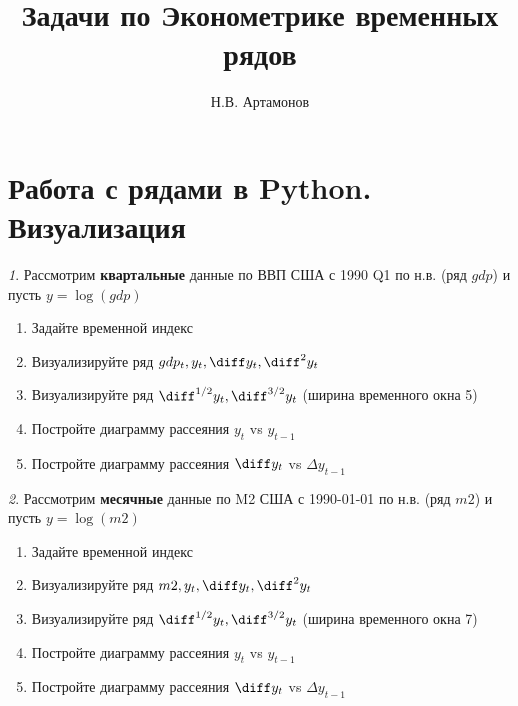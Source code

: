 \documentclass[12pt]{article}
\title{Задачи по Эконометрике временных рядов}
\author{Н.В. Артамонов}
\theoremstyle{remark}
\newtheorem{exercise}{}[subsection]
\begin{document}
\maketitle

\tableofcontents

\section{Работа с рядами в Python. Визуализация}

\begin{exercise}
Рассмотрим \textbf{квартальные} данные по ВВП США с 1990 Q1 по н.в. (ряд \(gdp\))
и пусть \(y=\log(gdp)\)
\begin{enumerate}
	\item Задайте временной индекс
	\item Визуализируйте ряд \(gdp_t, y_t, \diff y_t, \diff^2 y_t\)
	\item Визуализируйте ряд \(\diff^{1/2} y_t, \diff^{3/2} y_t\) (ширина временного окна 5)
	\item Постройте диаграмму рассеяния \(y_t\) vs \(y_{t-1}\)
	\item Постройте диаграмму рассеяния \(\diff y_t\) vs \(\Delta y_{t-1}\)
\end{enumerate}
\end{exercise}

\begin{exercise}
Рассмотрим \textbf{месячные} данные по M2 США с 1990-01-01 по н.в. (ряд \(m2\))
и пусть \(y=\log(m2)\)
\begin{enumerate}
	\item Задайте временной индекс
	\item Визуализируйте ряд \(m2, y_t, \diff y_t, \diff^2 y_t\)
	\item Визуализируйте ряд \(\diff^{1/2} y_t, \diff^{3/2} y_t\) (ширина временного окна 7)
	\item Постройте диаграмму рассеяния \(y_t\) vs \(y_{t-1}\)
	\item Постройте диаграмму рассеяния \(\diff y_t\) vs \(\Delta y_{t-1}\)
\end{enumerate}
\end{exercise}
\end{document}
